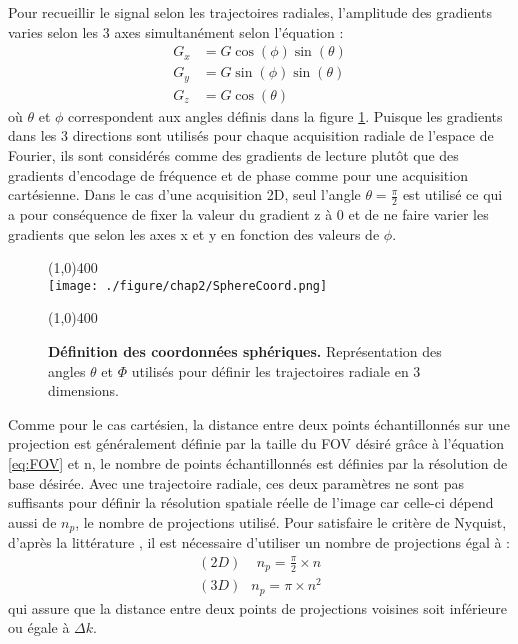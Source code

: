 Pour recueillir le signal selon les trajectoires radiales, l'amplitude des gradients varies selon les 3 axes simultanément selon l'équation :
\begin{equation}
\label{eq:AngleRadial}
\begin{split}
	G_x & =G\cos(\phi)\sin(\theta)\\
	G_y & =G\sin(\phi)\sin(\theta)\\	
	G_z & =G\cos(\theta)
\end{split}
\end{equation}
où $\theta$ et $\phi$ correspondent aux angles définis dans la figure \ref{fig:SphereCoord}.
Puisque les gradients dans les 3 directions sont utilisés pour chaque acquisition radiale de l'espace de Fourier, ils sont considérés comme des gradients de lecture plutôt que des gradients d'encodage de fréquence et de phase comme pour une acquisition cartésienne. Dans le cas d'une acquisition 2D, seul l'angle $\theta = \frac{\pi}{2}$ est utilisé ce qui a pour conséquence de fixer la valeur du gradient z à 0 et de ne faire varier les gradients que selon les axes x et y en fonction des valeurs de $\phi$.

\begin{figure} [H]
\centering
\line(1,0){400} \\
\texttt{[image: ./figure/chap2/SphereCoord.png]}
\caption[Définition des coordonnées sphériques.]{\label{fig:SphereCoord} \textbf{Définition des coordonnées sphériques.} Représentation des angles $\theta$ et $\Phi$ utilisés  pour définir les trajectoires radiale en 3 dimensions.}
\line(1,0){400} \\
\end{figure}

Comme pour le cas cartésien, la distance entre deux points échantillonnés sur une projection est généralement définie par la taille du FOV désiré grâce à l'équation \ref{eq:FOV} et n, le nombre de points échantillonnés est définies par la résolution de base désirée. Avec une trajectoire radiale, ces deux paramètres ne sont pas suffisants pour définir la résolution spatiale réelle de l'image car celle-ci dépend aussi de $n_p$, le nombre de projections utilisé. Pour satisfaire le critère de Nyquist, d'après la littérature \cite{bernstein2004handbook}, il est nécessaire d'utiliser un nombre de projections égal à :
\begin{equation}
\label{eq:NyquistRad}
\begin{aligned}
	(2D)\;\;\;\; n_p = \frac{\pi}{2} \times n \\
	(3D)\;\ \ n_p = \pi \times n^2 
\end{aligned}
\end{equation}
qui assure que la distance entre deux points de projections voisines soit inférieure ou égale à $\Delta k$.

